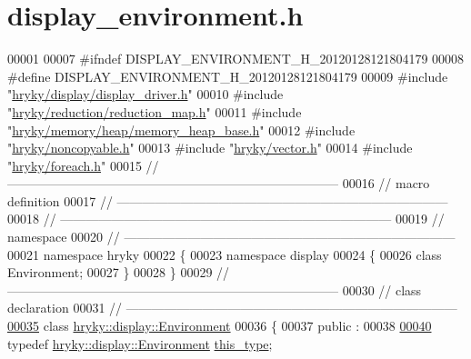 \hypertarget{display__environment_8h_source}{\section{display\-\_\-environment.\-h}
}

\begin{DoxyCode}
00001 
00007 \textcolor{preprocessor}{#ifndef DISPLAY\_ENVIRONMENT\_H\_20120128121804179}
00008 \textcolor{preprocessor}{}\textcolor{preprocessor}{#define DISPLAY\_ENVIRONMENT\_H\_20120128121804179}
00009 \textcolor{preprocessor}{}\textcolor{preprocessor}{#include "\hyperlink{display__driver_8h}{hryky/display/display_driver.h}"}
00010 \textcolor{preprocessor}{#include "\hyperlink{reduction__map_8h}{hryky/reduction/reduction_map.h}"}
00011 \textcolor{preprocessor}{#include "\hyperlink{memory__heap__base_8h}{hryky/memory/heap/memory_heap_base.h}"}
00012 \textcolor{preprocessor}{#include "\hyperlink{noncopyable_8h}{hryky/noncopyable.h}"}
00013 \textcolor{preprocessor}{#include "\hyperlink{vector_8h}{hryky/vector.h}"}
00014 \textcolor{preprocessor}{#include "\hyperlink{foreach_8h}{hryky/foreach.h}"}
00015 \textcolor{comment}{//
      ------------------------------------------------------------------------------}
00016 \textcolor{comment}{// macro definition}
00017 \textcolor{comment}{//
      ------------------------------------------------------------------------------}
00018 \textcolor{comment}{//
      ------------------------------------------------------------------------------}
00019 \textcolor{comment}{// namespace}
00020 \textcolor{comment}{//
      ------------------------------------------------------------------------------}
00021 \textcolor{keyword}{namespace }hryky
00022 \{
00023 \textcolor{keyword}{namespace }display
00024 \{
00026     \textcolor{keyword}{class }Environment;
00027 \}
00028 \}
00029 \textcolor{comment}{//
      ------------------------------------------------------------------------------}
00030 \textcolor{comment}{// class declaration}
00031 \textcolor{comment}{//
      ------------------------------------------------------------------------------}
\hypertarget{display__environment_8h_source_l00035}{}\hyperlink{classhryky_1_1display_1_1_environment}{00035} \textcolor{comment}{}\textcolor{keyword}{class }\hyperlink{classhryky_1_1display_1_1_environment}{hryky::display::Environment}
00036 \{
00037 \textcolor{keyword}{public} :
00038 
\hypertarget{display__environment_8h_source_l00040}{}\hyperlink{classhryky_1_1display_1_1_environment_a6318fe148797bbe0f7ca7417f3c391bd}{00040}     \textcolor{keyword}{typedef} \hyperlink{classhryky_1_1display_1_1_environment}{hryky::display::Environment} \hyperlink{classhryky_1_1display_1_1_environment_a6318fe148797bbe0f7ca7417f3c391bd}{this_type};

\end{DoxyCode}
